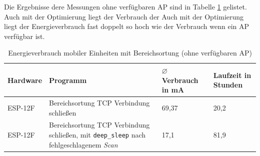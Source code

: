 Die Ergebnisse dere Messungen ohne verfügbaren AP sind in Tabelle \ref{table:noapina} gelistet.
Auch mit der Optimierung liegt der Verbrauch der 
Auch mit der Optimierung liegt der Energieverbrauch fast doppelt so hoch wie der Verbrauch wenn ein AP verfügbar ist.

\begin{table}[h!]
	\centering
	\caption{Energieverbrauch mobiler Einheiten mit Bereichsortung (ohne verfügbaren AP)}
	\label{table:noapina}
	\begin{tabular}{p{3.5cm}|p{5cm}|p{2.5cm}|p{2.5cm}}
		Hardware & Programm & $\varnothing$ Verbrauch in mA & Laufzeit in Stunden\\
		\hline
		ESP-12F & Bereichsortung TCP Verbindung schließen & 69,37 & 20,2\\
		ESP-12F & Bereichsortung TCP Verbindung schließen, mit \texttt{deep\_sleep} nach fehlgeschlagenem \emph{Scan} & 17,1 & 81,9\\
	\end{tabular}
\end{table}


